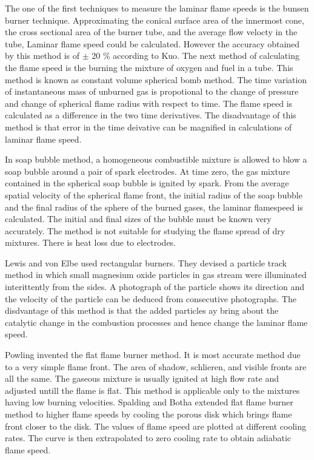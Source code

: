  The one of the first techniques to measure the laminar flame
speeds is the bunsen burner technique. Approximating the conical
surface area of the innermost cone, the cross sectional area of the
burner tube, and the average flow velocty in the tube, Laminar flame
speed could be calculated. However the accuracy obtained by this
method is of $\pm $ 20 \% according to Kuo\cite{Kuo}. The next method
of calculating the flame speed is the burning the mixture of oxygen
and fuel in a tube. This method is known as constant volume spherical
bomb method\cite{Kuo}. The time variation of instantaneous mass of
unburned gas is propotional to the change of pressure and change of
spherical flame radius with respect to time. The flame speed is
calculated as a difference in the two time derivatives. The
disadvantage of this method is that error in the time deivative can be
magnified in calculations of laminar flame speed.

 In soap bubble method, a homogeneous combustible mixture is
allowed to blow a soap bubble around a pair of spark electrodes. At
time zero, the gas mixture contained in the spherical soap bubble is
ignited by spark. From the average spatial velocity of the spherical
flame front, the initial radius of the soap bubble and the final
radius of the sphere of the burned gases, the laminar flamespeed is
calculated. The initial and final sizes of the bubble must be known
very accurately. The method is not suitable for studying the flame
spread of dry mixtures. There is heat loss due to electrodes.

 Lewis and von Elbe\cite{lewis} used rectangular
burners. They devised a particle track method in which small magnesium
oxide particles in gas stream were illuminated interittently from the
sides. A photograph of the particle shows its direction and the
velocity of the particle can be deduced from consecutive
photographs. The disdvantage of this method is that the added
particles ay bring about the catalytic change in the combustion
processes and hence change the laminar flame speed.

 Powling\cite{powling} invented the flat flame burner
method. It is most accurate method due to a very simple flame
front. The area of shadow, schlieren, and visible fronts are all the
same. The gaseous mixture is usually ignited at high flow rate and
adjusted untill the flame is flat. This method is applicable only to
the mixtures having low burning velocities. Spalding and
Botha\cite{splading} extended flat flame burner method to higher flame
speeds by cooling the porous disk which brings flame front closer to
the disk. The values of flame speed are plotted at different cooling
rates. The curve is then extrapolated to zero cooling rate to obtain
adiabatic flame speed.


